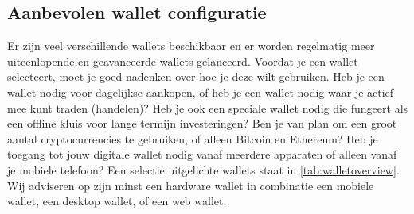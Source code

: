 \subsection*{Aanbevolen wallet configuratie}

Er zijn veel verschillende wallets beschikbaar en er worden regelmatig meer uiteenlopende en geavanceerde wallets gelanceerd. Voordat je een wallet selecteert, moet je goed nadenken over hoe je deze wilt gebruiken. Heb je een wallet nodig voor dagelijkse aankopen, of heb je een wallet nodig waar je actief mee kunt traden (handelen)? Heb je ook een speciale wallet nodig die fungeert als een offline kluis voor lange termijn investeringen? Ben je van plan om een groot aantal cryptocurrencies te gebruiken, of alleen Bitcoin en Ethereum? Heb je toegang tot jouw digitale wallet nodig vanaf meerdere apparaten of alleen vanaf je mobiele telefoon? Een selectie uitgelichte wallets staat in \cref{tab:walletoverview}. Wij adviseren op zijn minst een hardware wallet in combinatie een mobiele wallet, een desktop wallet, of een web wallet.\medskip


